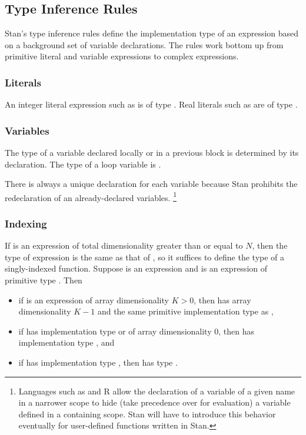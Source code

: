 \subsection{Type Inference Rules}

Stan's type inference rules define the implementation type of an
expression based on a background set of variable declarations.  The
rules work bottom up from primitive literal and variable expressions
to complex expressions.

\subsubsection{Literals}

An integer literal expression such as  is of type .
Real literals such as  are of type .

\subsubsection{Variables}

The type of a variable declared locally or in a previous block is
determined by its declaration.  The type of a loop variable is
.  

There is always a unique declaration for each variable because Stan
prohibits the redeclaration of an already-declared variables.%
%
\footnote{Languages such as \Cpp and R allow the declaration of a
  variable of a given name in a narrower scope to hide (take
  precedence over for evaluation) a variable defined in a containing
  scope.  Stan will have to introduce this behavior eventually for
  user-defined functions written in Stan.}

\subsubsection{Indexing}

If  is an expression of total dimensionality greater than or
equal to $N$, then the type of expression  is the
same as that of , so it suffices to define the type
of a singly-indexed function.  Suppose  is an expression and
 is an expression of primitive type .  Then
%
\begin{itemize}
\item if  is an expression of array dimensionality $K > 0$,
  then  has array dimensionality $K-1$ and the same
  primitive implementation type as ,
%
\item if  has implementation type  or
   of array dimensionality 0, then  has
  implementation type , and
%
\item if  has implementation type , then
   has type .
\end{itemize}

